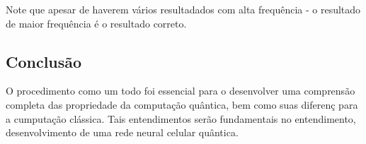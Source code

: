 \documentclass[12pt, a4paper]{article} %
\begin{document}
        Note que apesar de haverem v\'arios resultadados com alta frequ\^encia - o resultado de maior frequ\^encia é o resultado correto.
    
    \subsection{Conclusão}
    
        O procedimento como um todo foi essencial para o desenvolver uma comprensão completa das propriedade da computa\c{c}\~ao qu\^antica, bem como suas diferen\c{c} para a cumputa\c{c}\~ao cl\'assica. Tais entendimentos ser\~ao fundamentais no entendimento, desenvolvimento de uma rede neural celular qu\^antica.



    
\end{document}
